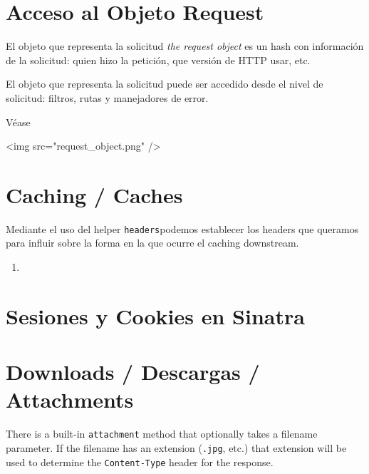 \section{Acceso al Objeto Request}
\label{section:requestobject}
El objeto que representa la solicitud {\it the request object}
es un hash con información de la solicitud: quien hizo la petición, 
que versión de HTTP usar, etc.

El objeto que representa la solicitud 
puede ser accedido desde el nivel de solicitud:
filtros, rutas y manejadores de error.

Véase 

\begin{rawhtml}
<img src="request_object.png" />
\end{rawhtml}


\section{Caching / Caches}
Mediante el uso del helper \verb|headers|podemos establecer los headers que queramos
para influir sobre la forma en la que ocurre el caching downstream.

\begin{enumerate}
\item {}
\end{enumerate}

\section{Sesiones y Cookies en Sinatra}



\section{Downloads / Descargas / Attachments}



There is a built-in \verb|attachment| method
that optionally takes a filename parameter. If the filename has
an extension (\verb|.jpg|, etc.) that extension 
will be used to determine the \verb|Content-Type| header for the response.

